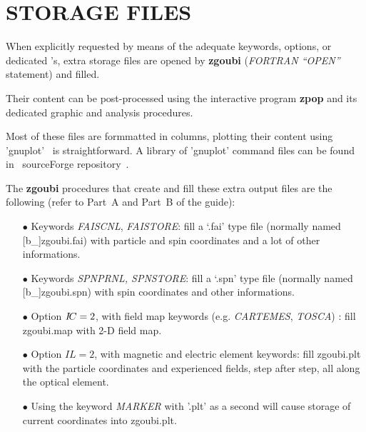 \section{STORAGE FILES} \label{secD-3}

When explicitly requested by means of the adequate keywords,  options, or dedicated 
\LABEL's, extra storage files are opened by \textbf{zgoubi} 
(\textsl{FORTRAN ``OPEN''} statement) and filled. 

\medskip

\noindent Their content can be    post-processed using the interactive program \textbf{zpop} and its dedicated graphic 
and analysis procedures. 

\bigskip

\noindent Most of these files are formmatted in columns, plotting their content using 
'gnuplot'~\cite{gnuplot} is 
straightforward. A library of 'gnuplot' command files can be found in \zgoubi\ sourceForge repository~\cite{SFZ}. 

\bigskip

\noindent The \textbf{zgoubi} procedures that create and fill these extra output 
files are the following (refer to Part~A and Part~B of the 
guide):

\begin{itemize}
  \item[$\bullet$] Keywords \textsl{FAISCNL}, \textsl{FAISTORE}:
   fill a `.fai' type file (normally 
  named [b\_]zgoubi.fai) with particle and spin 
coordinates and a lot of other informations. 

  \item[$\bullet$] Keywords \textsl{SPNPRNL, SPNSTORE}:
   fill  a `.spn' type file (normally 
  named [b\_]zgoubi.spn)  with spin 
coordinates and other informations. 

 \item[$\bullet$] Option $I\!C=2$, with field map keywords (e.g. 
 \textsl{CARTEMES}, 
\textsl{TOSCA}) : fill  zgoubi.map  with 2-D field map. 

  \item[$\bullet$] Option $IL=2$, with magnetic and electric element 
keywords: fill zgoubi.plt with the particle coordinates and 
experienced fields, step after step, all along the optical 
element.

  \item[$\bullet$] Using the keyword \textsl{MARKER}  
with '.plt' as a second \LABEL {} will cause storage of current coordinates into zgoubi.plt. 


\end{itemize}

